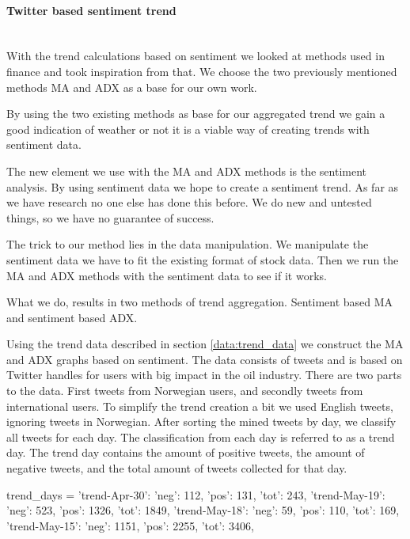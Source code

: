 \paragraph{Twitter based sentiment trend} 
\hspace{0pt}\\
With the trend calculations based on sentiment we looked at methods used in
finance and took inspiration from that. We choose the two
previously mentioned methods MA and ADX as a base for our own work. 

By using the two existing methods as base for our aggregated trend we gain a
good indication of weather or not it is a viable way of creating trends with sentiment data.

The new element we use with the MA and ADX methods is the sentiment analysis.
By using sentiment data we hope to create a sentiment trend. As far as we have
research no one else has done this before. We do new and untested things, so we
have no guarantee of success.  

The trick to our method lies in the data manipulation. We manipulate the
sentiment data we have to fit the existing format of stock data. Then we run
the MA and ADX methods with the sentiment data to see if it works.  

What we do, results in two methods of trend aggregation. Sentiment based MA and
sentiment based ADX. 
 
Using the trend data described in section \ref{data:trend_data} we construct
the MA and ADX graphs based on sentiment. The data consists of tweets and is
based on Twitter handles for users with big impact in the oil industry. There
are two parts to the data. First tweets from Norwegian users, and secondly
tweets from international users. To simplify the trend creation a bit we used
English tweets, ignoring tweets in Norwegian. After sorting the mined tweets by
day, we classify all tweets for each day. The classification from each day is
referred to as a trend day. The trend day contains the amount of positive
tweets, the amount of negative tweets, and the total amount of tweets collected
for that day. 

\begin{python}
trend_days = {
	'trend-Apr-30': {'neg': 112, 'pos': 131, 'tot': 243},
    'trend-May-19': {'neg': 523, 'pos': 1326, 'tot': 1849},
    'trend-May-18': {'neg': 59, 'pos': 110, 'tot': 169},
    'trend-May-15': {'neg': 1151, 'pos': 2255, 'tot': 3406},
}
\end{python}  

